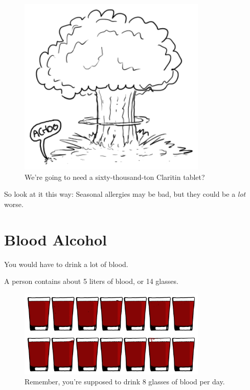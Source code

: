 {\begin{figure}[!htbp]
\centering
\includegraphics[scale=0.5, max width=0.8\textwidth]{imgs/a/97/mushroom.png}
\caption{We're going to need a sixty-thousand-ton Claritin tablet?}
\end{figure}

{So look at it this way: Seasonal allergies may be bad, but they could be a \emph{lot} worse.}

{
\chapter{Blood Alcohol}
}

\hfill{}

{You would have to drink a lot of blood.}

{A person contains about 5 liters of blood, or 14 glasses.}

\begin{figure}[!htbp]
\centering
\includegraphics[scale=0.5, max width=0.8\textwidth]{imgs/a/98/glasses.png}
\caption{Remember, you're supposed to drink 8 glasses of blood per day.}
\end{figure}

}
